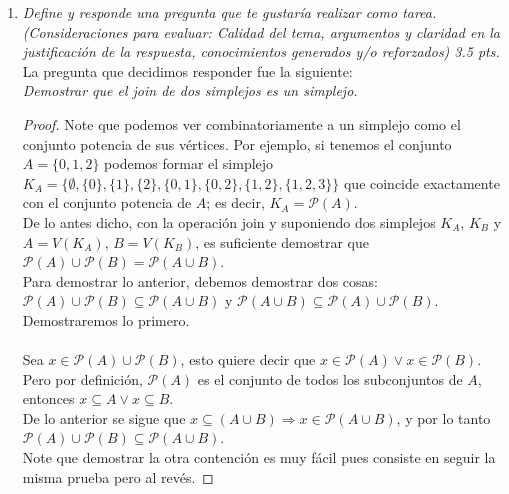 \documentclass{article}
\begin{document}
\begin{enumerate}
  \item{
    \textsl{
      Define y responde una pregunta que te gustaría realizar como
      tarea. (Consideraciones para evaluar: Calidad del tema,
      argumentos y claridad en la justificación de la respuesta,
      conocimientos generados y/o reforzados) 3.5 pts.\\
    }
    La pregunta que decidimos responder fue la siguiente:\\
    \textsl { Demostrar que el join de dos simplejos es un simplejo. }
    \begin{proof}
    Note que podemos ver combinatoriamente a un simplejo como el conjunto
    potencia de sus vértices. Por ejemplo, si tenemos el conjunto $A = \{0, 1, 2\}$
    podemos formar el simplejo $K_{A} = \{\emptyset, \{0\}, \{1\}, \{2\}, \{0,1\},\{0,2\},\{1,2\},\{1,2,3\}\}$
    que coincide exactamente con el conjunto potencia de $A$; es decir,
    $K_{A} = \mathcal{P}(A)$.\\
    De lo antes dicho, con la operación join y suponiendo dos simplejos $K_{A}$, $K_{B}$ y
    $A = V(K_{A})$, $B = V(K_{B})$, es suficiente demostrar que $\mathcal{P}(A) \cup \mathcal{P}(B) = 
    \mathcal{P}(A \cup B)$.\\
    Para demostrar lo anterior, debemos demostrar dos cosas: $\mathcal{P}(A) \cup \mathcal{P}(B) \subseteq
     \mathcal{P}(A \cup B)$ y $ \mathcal{P}(A \cup B) \subseteq \mathcal{P}(A) \cup \mathcal{P}(B) $.\\
     Demostraremos lo primero.\\\\
     Sea $x \in \mathcal{P}(A) \cup \mathcal{P}(B)$, esto quiere decir que $x \in \mathcal{P}(A) \vee 
     x \in \mathcal{P}(B)$. Pero por definición, $\mathcal{P}(A)$ es el conjunto de todos los subconjuntos
     de $A$, entonces $x \subseteq A \vee x \subseteq B$.\\
     De lo anterior se sigue que $x \subseteq (A \cup B) \Rightarrow x \in \mathcal{P}(A \cup B)$, y por
     lo tanto $\mathcal{P}(A) \cup \mathcal{P}(B) \subseteq \mathcal{P}(A \cup B)$.\\
     Note que demostrar la otra contención es muy fácil pues consiste en seguir la misma prueba pero al revés.
    \end{proof}
  }

\end{enumerate}
\end{document}
